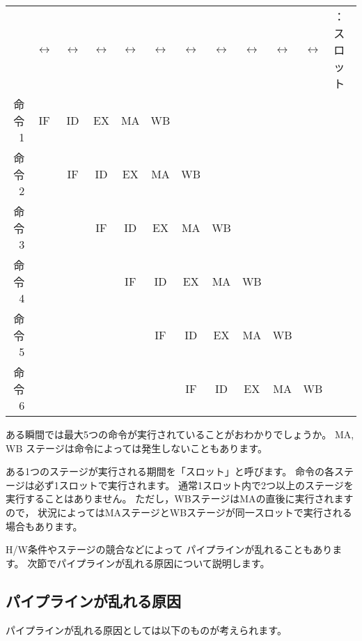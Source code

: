 \documentclass[a4j,10pt,fleqn]{jsarticle}
\begin{document}
\begin{center}\begin{tabular}{r|c|c|c|c|c|c|c|c|c|cl}
 & $\leftrightarrow$ & $\leftrightarrow$ & $\leftrightarrow$ & $\leftrightarrow$ & $\leftrightarrow$
 & $\leftrightarrow$ & $\leftrightarrow$ & $\leftrightarrow$ & $\leftrightarrow$ & $\leftrightarrow$ & ：スロット \\
命令1 & IF & ID & EX & MA & WB &    &    &    &    &    & \\
命令2 &    & IF & ID & EX & MA & WB &    &    &    &    & \\
命令3 &    &    & IF & ID & EX & MA & WB &    &    &    & \\
命令4 &    &    &    & IF & ID & EX & MA & WB &    &    & \\
命令5 &    &    &    &    & IF & ID & EX & MA & WB &    & \\
命令6 &    &    &    &    &    & IF & ID & EX & MA & WB & \\
\end{tabular}\end{center}

ある瞬間では最大5つの命令が実行されていることがおわかりでしょうか。
MA, WB ステージは命令によっては発生しないこともあります。

ある1つのステージが実行される期間を「スロット」と呼びます。
命令の各ステージは必ず1スロットで実行されます。
通常1スロット内で2つ以上のステージを実行することはありません。
ただし，WBステージはMAの直後に実行されますので，
状況によってはMAステージとWBステージが同一スロットで実行される場合もあります。

H/W条件やステージの競合などによって
パイプラインが乱れることもあります。
次節でパイプラインが乱れる原因について説明します。


\subsection{パイプラインが乱れる原因}

パイプラインが乱れる原因としては以下のものが考えられます。
\end{document}
